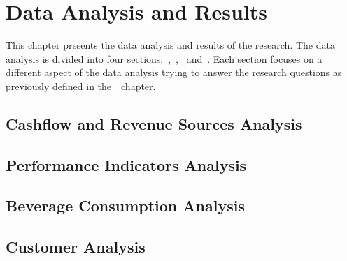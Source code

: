 \chapter{Data Analysis and Results}
\label{ch:data-analysis-and-results}

This chapter presents the data analysis and results of the research.
The data analysis is divided into four sections:~,~,~ and~.
Each section focuses on a different aspect of the data analysis trying to answer the research questions as previously defined in the~~chapter.


\section{Cashflow and Revenue Sources Analysis}
\label{sec:analysis-cashflow-and-revenue-sources}


\section{Performance Indicators Analysis}
\label{sec:analysis-performance-indicators}


\section{Beverage Consumption Analysis}
\label{sec:analysis-beverage-consumption}


\section{Customer Analysis}
\label{sec:analysis-customers}

